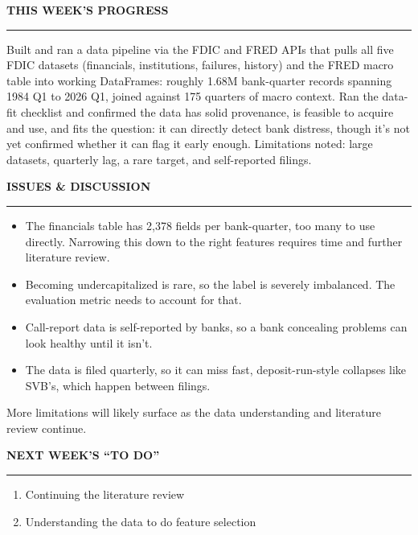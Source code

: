 \documentclass[11pt,letterpaper]{article}
\newcommand{\sectionhead}[1]{%
  \vspace{6pt}%
  {\sffamily\bfseries\fontsize{9.5}{12}\selectfont\color{navy}\MakeUppercase{#1}}\par
  \vspace{-9pt}\textcolor{hairline}{\rule{\textwidth}{0.5pt}}\par\vspace{0pt}}
\newcommand{\answer}[1]{#1\par\vspace{3pt}}
\begin{document}
\sectionhead{This week's progress}
\answer{Built and ran a data pipeline via the FDIC and FRED APIs that pulls all five FDIC datasets (financials, institutions, failures, history) and the FRED macro table into working DataFrames: roughly 1.68M bank-quarter records spanning 1984 Q1 to 2026 Q1, joined against 175 quarters of macro context. Ran the data-fit checklist and confirmed the data has solid provenance, is feasible to acquire and use, and fits the question: it can directly detect bank distress, though it's not yet confirmed whether it can flag it early enough. Limitations noted: large datasets, quarterly lag, a rare target, and self-reported filings.}

\sectionhead{Issues \& discussion}
\answer{\begin{itemize}[topsep=1pt,itemsep=1pt,leftmargin=14pt,label=\textcolor{navy}{\footnotesize\textbullet}]
  \item The financials table has 2,378 fields per bank-quarter, too many to use directly. Narrowing this down to the right features requires time and further literature review.
  \item Becoming undercapitalized is rare, so the label is severely imbalanced. The evaluation metric needs to account for that.
  \item Call-report data is self-reported by banks, so a bank concealing problems can look healthy until it isn't.
  \item The data is filed quarterly, so it can miss fast, deposit-run-style collapses like SVB's, which happen between filings.
\end{itemize}
More limitations will likely surface as the data understanding and literature review continue.}

\sectionhead{Next week's ``To Do''}
\answer{\begin{enumerate}[topsep=1pt,itemsep=1pt,leftmargin=16pt,label=\textcolor{navy}{\bfseries\arabic*.}]
  \item Continuing the literature review
  \item Understanding the data to do feature selection
\end{enumerate}}
\end{document}
